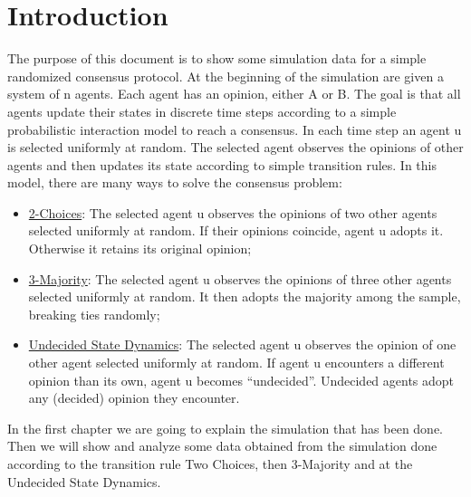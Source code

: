 \section{Introduction}
\label{Introduction}
The purpose of this document is to show some simulation data for a simple randomized consensus protocol.
At the beginning of the simulation are given a system of n agents. Each agent has an opinion, either A or B.
The goal is that all agents update their states in discrete time steps according to a simple probabilistic interaction model to reach a consensus.
In each time step an agent u is selected uniformly at random. The selected agent observes the opinions of other agents and then updates its state according to simple transition rules. In this model, there are many ways to solve the consensus problem:
\begin{itemize}
    \item \hyperref[2Choices]{2-Choices}: The selected agent u observes the opinions of two other agents selected uniformly at random. If their opinions coincide, agent u adopts it. Otherwise it retains its original opinion;
    \item \hyperref[3Majority]{3-Majority}: The selected agent u observes the opinions of three other agents selected uniformly at random. It then adopts the majority among the sample, breaking ties randomly;
    \item \hyperref[undecided]{Undecided State Dynamics}: The selected agent u observes the opinion of one other agent selected uniformly at random. If agent u encounters a different opinion than its own, agent u becomes “undecided”. Undecided agents adopt any (decided) opinion they encounter.
\end{itemize}


In the first chapter we are going to explain the simulation that has been done. Then we will show and analyze some data obtained from the simulation done according to the transition rule Two Choices, then 3-Majority and at the Undecided State Dynamics.
